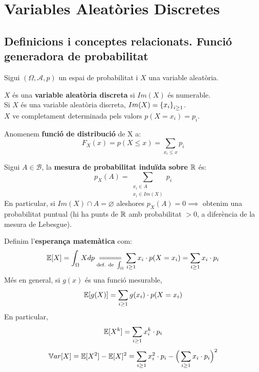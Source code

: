 \section{Variables Aleatòries Discretes}

\subsection{Definicions i conceptes relacionats. Funció generadora de probabilitat}

Sigui $(\Omega, \mathcal{A}, p)$ un espai de probabilitat i $X$ una variable aleatòria.

\begin{defi}
  $X$ és una \textbf{variable aleatòria discreta} si $Im(X)$ és numerable. \\
  Si $X$ és una variable aleatòria discreta, $Im(X) = \left\{x_{i}\right\}_{i \geq 1}$. \\ 
  $X$ ve completament determinada pels valors $p(X=x_{i}) = p_{i}$.
\end{defi}

\begin{defi}
  Anomenem \textbf{funció de distribució} de X a:
  \[
    F_{X}(x)=p(X \leq x) = \sum_{x_{i}\leq x}p_{i}
  \]
\end{defi}

\begin{defi}
  Sigui $A \in \mathcal{B}$, la \textbf{mesura de probabilitat induïda sobre} $\mathbb{R}$ és:
  \[
    p_{X}(A) = \sum_{\substack{x_{i} \in A \\ x_{i}\in Im(X)}}p_{i}
  \]
  En particular, si $Im(X)\cap A = \varnothing$ aleshores $p_{X}(A) = 0 \implies$ obtenim una probabilitat puntual 
  (hi ha punts de $\mathbb{R}$ amb probabilitat $> 0$, a diferència de la mesura de Lebesgue).
\end{defi}

\begin{defi}
  Definim l'\textbf{esperança matemàtica} com: 
  \[
    \E [X] = \int_{\Omega}Xdp \underset{\text{def. de }\int_{\Omega}}{=\joinrel=\joinrel=\joinrel=\joinrel=} 
    \sum_{i\geq 1}x_{i}\cdot p(X=x_{i}) = \sum_{i\geq 1}x_{i}\cdot p_{i}
  \]
  Més en general, si $g(x)$ és una funció mesurable, 
  \[
    \mathbb{E} [g(X)] = \sum_{i\geq 1}g(x_{i})\cdot p(X=x_{i})
  \]
  En particular, 
  \[
    \mathbb{E}[X^{k}]=\sum_{i\geq 1}x_{i}^{k}\cdot p_{i}
  \]
  \[
    \mathbb{V} ar[X] = \mathbb{E}[X^{2}]-\mathbb{E}[X]^{2}=\sum_{i\geq 1}x_{i}^{2}\cdot p_{i} - \Big(\sum_{i\geq 1}x_{i}\cdot p_{i} \Big)^{2}
  \]
\end{defi}

